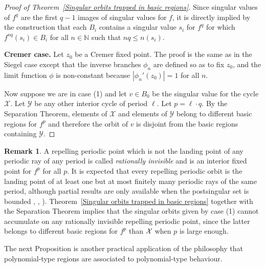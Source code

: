 \documentclass[11pt, twoside]{article}
\theoremstyle{definition}
\newtheorem{rem}[thm]{Remark}
\newcommand{\N}{\mathbb{N}}
\newcommand{\XX}{{\cal X}}
\begin{document}
\begin{proof}[Proof of Theorem~\ref{Singular orbits trapped in basic regions}]
 
  Since singular values of $f^q$ are  the first $q-1$ images of singular values for $f$, it is directly implied by the construction that each $B_i$ contains a singular value $s_i$ for $f^q$  for which $f^{nq}(s_i)\in B_i$ for all $n\in\N$ such that  $nq\leq n(s_i)$.
  
{\bf Cremer case.} Let $z_0$ be a Cremer fixed point. The proof is the same as in the Siegel case except that the inverse branches $\phi_n$ are defined so as to fix $z_0$, and the  limit function $\phi$   is non-constant because $|\phi_n'(z_0)|=1$ for all $n$.  
 
Now suppose we are in case (1) and let $v\in B_0$ be the singular value for the cycle $\mathcal{X}$. Let $\mathcal{Y}$ be any other interior cycle  of period $\ell$. Let $p=\ell\cdot q$. By the Separation Theorem,  elements of $\mathcal{X}$ and elements of $\mathcal{Y}$ belong to different basic regions for $f^p$ and therefore  the orbit of $v$ is disjoint from the basic regions containing $\mathcal{Y}$.  
 \end{proof}
  
   \begin{rem}\label{Invisible} A repelling periodic point which is not the landing point of any periodic ray of any period is called  \emph{rationally invisible} and is an interior fixed point for $f^p$ for all $p$. It is expected that every repelling periodic orbit is the landing point of at least one but at most finitely many periodic rays of the same period, although partial results are only available when the postsingular set is bounded \cite{Hu}, \cite{BL14}, \cite{BRG17}). Theorem~\ref{Singular orbits trapped in basic regions} together with the Separation Theorem implies that the singular orbits given by case (1)  cannot accumulate on any rationally invisible repelling periodic point, since the latter belongs  to different basic regions for $f^p$ than $\XX$ when $p$ is large enough. \end{rem}


 
The next Proposition is another practical application of the philosophy that polynomial-type regions are associated to polynomial-type behaviour.
\end{document}
